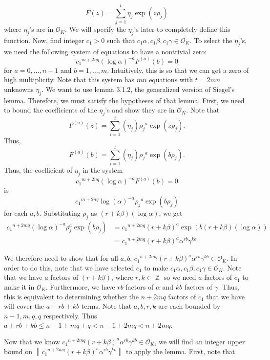 \documentclass[a4paper, 11pt]{book}
\DeclareMathOperator{\Z}{\mathbb{Z}}
\begin{document}
{\[F(z) = \sum\limits_{j=1}^{t}\eta_{j}\exp(z\rho_j)\]
where $\eta_j$'s are in $\mathcal{O}_K$. We will specify the $\eta_j$'s later to completely define this function. Now, find integer $c_1 > 0$ such that $c_1 \alpha, c_1 \beta, c_1 \gamma \in \mathcal{O}_K$. To select the $\eta_j$'s, we need the following system of equations to have a nontrivial zero: 
    \[{c_1}^{m + 2nq} {(\log \alpha)}^{-a}F^{(a)}(b) = 0\]
    for $a = 0, \ldots, n-1$ and $b = 1, \ldots, m$. Intuitively, this is so that we can get a zero of high multiplicity. Note that this system has $mn$ equations with $t = 2mn$ unknowns $\eta_j$. We want to use lemma 3.1.2, the generalized version of Siegel's lemma. Therefore, we must satisfy the hypotheses of that lemma. First, we need to bound the coefficients of the $\eta_j$'s and show they are in $\mathcal{O}_K$. Note that \[F^{(a)}(z) = \sum\limits_{i=1}^{t}(\eta_j){\rho_j}^{a}\exp(z\rho_j).\] Thus, \[F^{(a)}(b) = \sum\limits_{i=1}^{t}(\eta_j){\rho_j}^{a}\exp(b\rho_j).\] Thus, the coefficient of $\eta_j$ in the system \[{c_1}^{m + 2nq} {(\log \alpha)}^{-a}F^{(a)}(b) = 0\] is \[{c_1}^{m + 2nq} {\log(\alpha)}^{-\alpha}{\rho_j}^{a}\exp(b\rho_j)\] for each $a, b$. Substituting $\rho_j$ as $(r+k\beta)(\log \alpha)$, we get 
\begin{align*}
    {c_1}^{n+2mq}{(\log \alpha)}^{-a}\rho_j^{a}\exp(b\rho_j) &= {c_1}^{n+2mq}{(r + k\beta)}^{a}\exp\left(b(r+k\beta)(\log \alpha)\right) \\
                                                                &= {c_1}^{n+2mq}{(r+k\beta)}^{a}{\alpha}^{rb}\gamma^{kb}
\end{align*}

We therefore need to show that for all $a, b$, ${c_1}^{n+2mq}{(r+k\beta)}^{a}{\alpha}^{rb}\gamma^{kb} \in \mathcal{O}_K$. In order to do this, note that we have selected $c_1$ to make $c_1\alpha, c_1\beta, c_1\gamma \in \mathcal{O}_K$. Note that we have $a$ factors of $(r + k \beta)$, where $r, k \in \Z$ so we need $a$ factors of $c_1$ to make it in $\mathcal{O}_K$. Furthermore, we have $rb$ factors of $\alpha$ and $kb$ factors of $\gamma$. Thus, this is equivalent to determining whether the $n + 2mq$ factors of $c_1$ that we have will cover the $a + rb + kb$ terms. Note that $a, b, r, k$ are each bounded by $n-1, m, q, q$ respectively. Thus $a + rb + kb \leq n-1 + mq + q < n-1 + 2mq < n + 2mq$.\par

Now that we know ${c_1}^{n+2mq}{(r+k\beta)}^{a}{\alpha}^{rb}\gamma^{kb} \in \mathcal{O}_K$, we will find an integer upper bound on $\left\| {c_1}^{n+2mq}{(r+k\beta)}^{a}{\alpha}^{rb}\gamma^{kb} \right\|$ to apply the lemma. First, note that 

}
\end{document}
